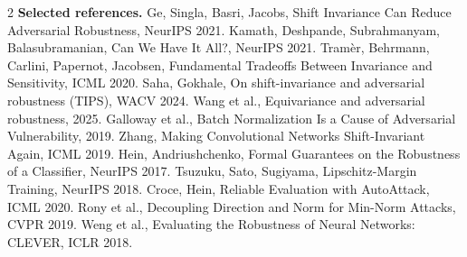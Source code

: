 \documentclass[10pt]{article}
\begin{document}
\begin{multicols}{2}
\vspace{2pt}
\textbf{Selected references.}
{\footnotesize Ge, Singla, Basri, Jacobs, Shift Invariance Can Reduce Adversarial Robustness, NeurIPS 2021.
Kamath, Deshpande, Subrahmanyam, Balasubramanian, Can We Have It All?, NeurIPS 2021.
Tram\`er, Behrmann, Carlini, Papernot, Jacobsen, Fundamental Tradeoffs Between Invariance and Sensitivity, ICML 2020.
Saha, Gokhale, On shift-invariance and adversarial robustness (TIPS), WACV 2024.
Wang et al., Equivariance and adversarial robustness, 2025.
Galloway et al., Batch Normalization Is a Cause of Adversarial Vulnerability, 2019.
Zhang, Making Convolutional Networks Shift-Invariant Again, ICML 2019.
Hein, Andriushchenko, Formal Guarantees on the Robustness of a Classifier, NeurIPS 2017.
Tsuzuku, Sato, Sugiyama, Lipschitz-Margin Training, NeurIPS 2018.
Croce, Hein, Reliable Evaluation with AutoAttack, ICML 2020.
Rony et al., Decoupling Direction and Norm for Min-Norm Attacks, CVPR 2019.
Weng et al., Evaluating the Robustness of Neural Networks: CLEVER, ICLR 2018.
}

\end{multicols}
\end{document}
